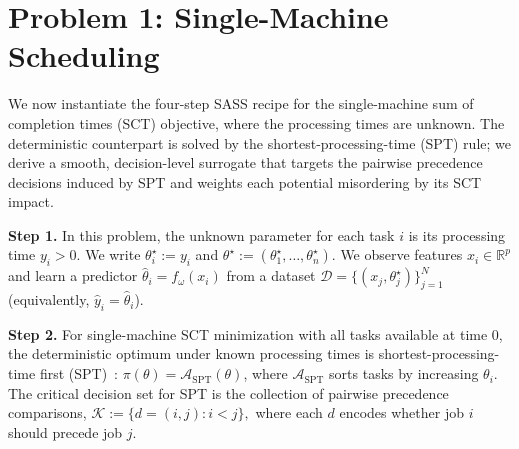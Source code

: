 \documentclass{article}
\begin{document}
\section{Problem 1: Single-Machine Scheduling}
\label{sec:problem1}
We now instantiate the four-step SASS recipe for the
single-machine sum of completion times (SCT) objective, where the processing times are unknown.
The deterministic counterpart is solved by the shortest-processing-time (SPT)
rule; we derive a smooth, decision-level surrogate that targets the pairwise
precedence decisions induced by SPT and weights each potential misordering by
its SCT impact.

\noindent\textbf{Step 1.}
In this problem, the unknown parameter for each task $i$ is its processing time
$y_i>0$. We write
$\theta_i^\star := y_i$ and $\theta^\star := (\theta_1^\star,\dots,\theta_n^\star)$.
We observe features $x_i\in\mathbb{R}^p$ and learn a predictor
$\hat{\theta}_i = f_\omega(x_i)$ from a dataset
$\mathcal{D} = \{(x_j, \theta_j^\star)\}_{j=1}^N$ (equivalently, $\hat{y}_i=\hat{\theta}_i$).

\noindent\textbf{Step 2.}
For single-machine SCT minimization with all tasks available at time $0$, the deterministic optimum under known processing times is shortest-processing-time first (SPT)~\cite{pinedo2022scheduling}:
\(
\pi(\theta)=\mathcal{A}_{\mathrm{SPT}}(\theta)
\),
where $\mathcal{A}_{\mathrm{SPT}}$ sorts tasks by increasing $\theta_i$.
The critical decision set for SPT is the collection of pairwise precedence comparisons,
\(
\mathcal{K} := \{d=(i,j): i<j\},
\)
where each $d$ encodes whether job $i$ should precede job $j$.
\end{document}
